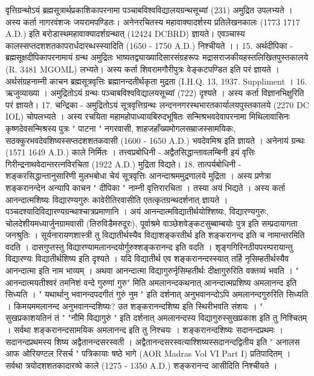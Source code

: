 वृत्तिग्रन्थोऽयं ब्रह्मसूत्रार्थप्रकाशिकापरनामा पञ्चाबविश्वविद्यालयग्रन्थसूच्यां (231) अमुद्रित उपलभ्यते । अस्य कर्ता नागरवंशजः जयरामपण्डितः। अनेनरचितस्य महावाक्यादर्शस्य प्रतिलेखनकालः (1773 1717 A.D.) इति बरोडास्थमहावाक्यादर्शग्रन्थात् (12424 DCBRD) ज्ञायते। एवञ्चास्य कालस्सप्तदशशतकापरार्धदारब्धस्स्यादिति (1650 - 1750 A.D.) निश्चीयते ।। 
15. अर्थदीपिका - 
ब्रह्मसूक्षदीपिकापरनामायं ग्रन्थ अमुद्रितः भाष्यतद्व्याख्यादिसारसंग्रहरूपः मद्रासराजकीयहस्तलिखितपुस्तकालये (R. 3481 MGOML) लभ्यते। अस्य कर्ता शिवरामगौरीपुत्रः वेङ्कटपण्डित इति परं ज्ञायते ।  
अर्थसंग्रहनाम्नी काचन ब्रह्मसूत्रवृत्तिः ब्रह्मानन्दतीर्थकृता मुद्रता (I.H.Q. 13, 1937. Suppliment ।
16. ऋजुव्याख्या । अमुद्रितोऽयं ग्रन्थः पञ्चाबविश्वविद्यालयसूच्यां (722) दृश्यते । अस्य कर्ता विज्ञानभिक्षुरिति परं ज्ञायते। 
17. चन्द्रिका - 
अमुद्रितोऽयं सूत्रवृत्तिग्रन्थः लन्दननगरस्थभारतकार्यालयपुस्तकालये (2270 DC IOL) चोपलभ्यते । अस्य रचयिता महामहोपाध्यायबिरुदभूषितः सन्मिश्रभवदेवापरनामा मिथिलावासिनः कृष्णदेवसन्मिश्रस्य पुत्रः " पाटना " नगरवासी, शाहजहाँख्यमोगलसम्राजस्सामयिकः, सठक्कुरभवदेवशिष्यस्सप्तदशशतकवासी (1600 - 1650 A.D.) भवदेवमिश्र इति ज्ञायते । अनेनायं ग्रन्थः (1571 1649 A.D.) काले निर्मितः । 
तत्त्वप्रबोधिनी - 
अद्वैतसिद्धान्तावलम्बिनी इयं वृत्तिः गिरीन्द्रनाथवेदान्तरत्नविरचिता (1922 A.D.) मुद्रिता विद्यते। 
18. तात्पर्यबोधिनी - 
शङ्करसिद्धान्तानुसारिणी मुलभबोधा चेयं सूत्रवृत्तिः आनन्दाश्रममुद्रणालये मुद्रिता । अस्य प्रणेत्रा शङ्करानन्देन अन्यापि काचन " दीपिका " नाम्नी वृत्तिरारचिता । तस्या अयं भिद्यते । अस्य कर्ता आनन्दात्मशिष्यः विद्यारण्यगुरुः कावेरीतिरवासीति एतत्कृतग्रन्थदर्शनात् ज्ञायते । पञ्चदश्यादिविद्यारण्यग्रन्थाश्चात्रप्रमाणानि । अयं आनन्दात्मविद्यातीर्थयोश्शिष्यः, विद्यारण्यगुरुः, चोलदेशीयमध्यार्जुनग्रामवासी (तिरुविडैमरुदूरः), पूर्वाश्रमे वाञ्छेशवेङ्कटसुब्बाम्बयोः पुत्र इति सम्प्रदायागता जनश्रुतिः । सूर्यनारायणशास्त्री तु विद्यातीर्थस्यैव विद्याशङ्करतीर्थ इति शङ्करानन्द इति च नामान्तरमिति वदति । दासगुप्तस्तु विद्यारण्यामलानन्दयोर्गुरुश्शङ्करानन्द इति वदति । शृङ्गगिरिनठीयपरम्परायान्तु विद्यारण्यः विद्यातीर्थशिष्य इति दृश्यते । यदि विद्यातीर्थ एव शङ्करानन्दस्स्यात् तर्हि नृसिम्हतीर्थस्यैव आनन्दात्मा इति नाम भाव्यम् । अथवा आनन्दात्मा विद्यागुरुर्नृसिम्हतीर्थः दीक्षागुरुरिति वक्तव्यं भवति । " आनन्दात्मयतीश्वरं तमनिशं वन्दे गुरुणां गुरु" मिति अमलानन्दकथनात् आनन्दात्मप्रशिष्य अमलानन्द इति सिध्यति । " यथार्थानु भवानन्दपदगीतं गुरुं नुम " इति दर्शनात् अनुभवानन्दोऽपि अमलानन्दगुरुरिति सिध्यति । किमयममलानन्द अनुभवानन्दशिष्यः? उत शङ्करानन्दशिष्य इति स्थिरीभवति संशयः । " सुखप्रकाशयतिनं तं " "नौमि विद्यागुरुं " इति दर्शनात् अमलानन्दस्य विद्यागुरुस्सुखप्रकाश इति तु निश्चितम् । सर्वथा शङ्करानन्दसामयिक अमलानन्द इति तु निश्चयः । शङ्करानन्दशिष्यः सदानन्दप्रथमः । सदानन्दप्रथमस्य शिष्य अद्वैतानन्दसरस्वती । अद्वैतानन्दसरस्वत्याश्शिष्यस्सदानन्दद्वितीय इति " अनालस आफ ओरियण्टल रिसर्च " पत्रिकायाः षष्ठे भागे (AOR Madras Vol VI Part I) प्रतिपादितम् । सर्वथा त्रयोदशशतकादारव्घे काले (1275 - 1350 A.D.) शङ्करानन्द आसीदिति निश्चीयते । 
